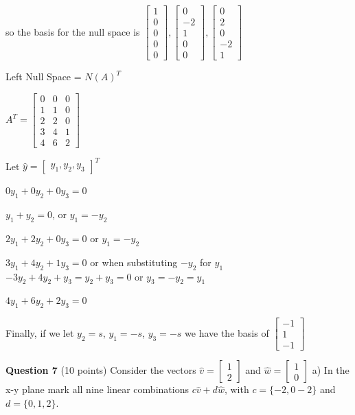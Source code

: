 \documentclass{article}
\begin{document}
so the basis for the null space is $\begin{bmatrix}
    1 \\ 0 \\ 0 \\ 0 \\ 0
\end{bmatrix}, \begin{bmatrix}
    0 \\ -2 \\ 1 \\ 0 \\ 0
\end{bmatrix}, \begin{bmatrix}
    0 \\ 2 \\ 0 \\ -2 \\ 1
\end{bmatrix}$

Left Null Space = $N(A)^T$

$A^T = \begin{bmatrix}
    0 & 0 & 0 \\
    1 & 1 & 0 \\
    2 & 2 & 0 \\
    3 & 4 & 1 \\
    4 & 6 & 2
\end{bmatrix}$

Let $\hat{y} = \begin{bmatrix}
    y_1, y_2, y_3
\end{bmatrix}^T$

$0y_1 + 0y_2 + 0y_3 = 0$

$y_1 + y_2 = 0$, or $y_1 = -y_2$

$2y_1 + 2y_2 + 0y_3 = 0$ or $y_1 = -y_2$

$3y_1 + 4y_2 + 1y_3 = 0$ or when substituting $-y_2$ for $y_1$ $-3y_2 + 4y_2 + y_3 = y_2 + y_3 = 0$ or $y_3 = -y_2 = y_1$

$4y_1 + 6y_2 + 2y_3 = 0$

Finally, if we let $y_2 = s$, $y_1 = -s$, $y_3 = -s$ we have the basis of $\begin{bmatrix}
    -1 \\ 1 \\ -1
\end{bmatrix}$

\vspace{2em}
\noindent
\textbf{Question 7} (10 points) Consider the vectors $\hat{v} = \begin{bmatrix}
    1 \\ 2
\end{bmatrix}$ and $\hat{w} = \begin{bmatrix}
    1 \\ 0
\end{bmatrix}$
\noindent
a) In the x-y plane mark all nine linear combinations $c\hat{v} + d\hat{w}$, with $c = \{-2, 0 -2\}$ and $d = \{ 0, 1, 2\}$.
\end{document}
